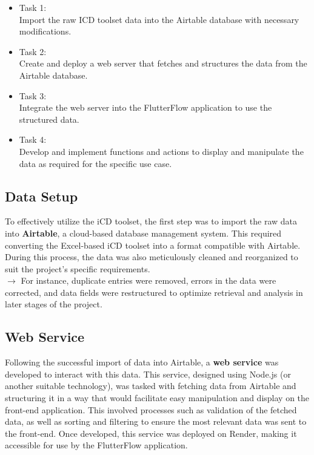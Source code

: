 \begin{itemize}
    \item Task 1: \\
          Import the raw ICD toolset data into the Airtable database with necessary modifications.
    \item Task 2: \\
          Create and deploy a web server that fetches and structures the data from the Airtable database.
    \item Task 3: \\
          Integrate the web server into the FlutterFlow application to use the structured data.
    \item Task 4: \\
          Develop and implement functions and actions to display and manipulate the data as required for the specific use case.
\end{itemize}


\subsection{Data Setup}

To effectively utilize the iCD toolset, the first step was to import the raw data into {\color{limeGreen}\textbf{Airtable}}, a cloud-based database management system. 
This required converting the Excel-based iCD toolset into a format compatible with Airtable. 
During this process, the data was also meticulously cleaned and reorganized to suit the project's specific requirements. \\
$ \rightarrow $ \quad For instance, duplicate entries were removed, errors in the data were corrected, and data fields were restructured to optimize retrieval and analysis in later stages of the project.

\subsection{Web Service}

Following the successful import of data into Airtable, a {\color{limeGreen}\textbf{web service}} was developed to interact with this data. 
This service, designed using Node.js (or another suitable technology), was tasked with fetching data from Airtable and structuring it in a way that would facilitate easy manipulation and display on the front-end application. 
This involved processes such as validation of the fetched data, as well as sorting and filtering to ensure the most relevant data was sent to the front-end. 
Once developed, this service was deployed on Render, making it accessible for use by the FlutterFlow application.


